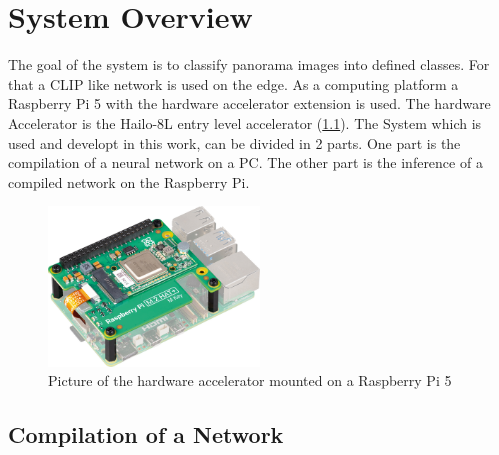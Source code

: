 \chapter{System Overview}

The goal of the system is to classify panorama images into defined classes.
For that a CLIP like network is used on the edge.
As a computing platform a Raspberry Pi 5 with the hardware accelerator extension is used.
The hardware Accelerator is the Hailo-8L entry level accelerator (\cref{fig:overview:aikit}).
The System which is used and developt in this work, can be divided in 2 parts.
One part is the compilation of a neural network on a PC.
The other part is the inference of a compiled network on the Raspberry Pi.

\begin{figure}[h]
    \centering
    \includegraphics[width=0.5\textwidth]{Images/SystemOverview/ai-kit.png}
    \caption{Picture of the hardware accelerator mounted on a Raspberry Pi 5\cite{bildAiKit}}
    \label{fig:overview:aikit}
\end{figure}



\section{Compilation of a Network}

